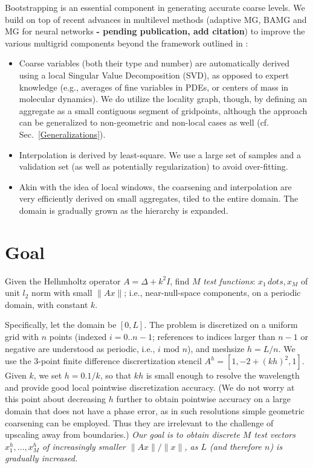 \documentclass{article}
\begin{document}
Bootstrapping is an essential component in generating accurate coarse levels. We build on top of recent advances in multilevel methods (adaptive MG, BAMG \cite{bamg, lamg, mg_guide} and MG for neural networks \textbf{- pending publication, add citation}) to improve the various multigrid components beyond the framework outlined in \cite{su}:
\begin{itemize}
	\item Coarse variables (both their type and number) are automatically derived using a local Singular Value Decomposition (SVD), as opposed to expert knowledge (e.g., averages of fine variables in PDEs, or centers of mass in molecular dynamics). We do utilize the locality graph, though, by defining an aggregate as a small contiguous segment of gridpoints, although the approach can be generalized to non-geometric and non-local cases as well (cf. Sec.~\ref{Generalizations}).
	\item Interpolation is derived by least-square. We use a large set of samples and a validation set (as well as potentially regularization) to avoid over-fitting.
	\item Akin with the idea of local windows, the coarsening and interpolation are very efficiently derived on small aggregates, tiled to the entire domain. The domain is gradually grown as the hierarchy is expanded.
\end{itemize}

\section{Goal}
Given the Helhmholtz operator $A = \Delta + k^2 I$, find $M$ \emph{test functions}: $x_1\,dots,x_M$ of unit $l_2$ norm with small $\|A x\|$; i.e., near-null-space components, on a periodic domain, with constant $k$. 

Specifically, let the domain be $[0,L]$. The problem is discretized on a uniform grid with $n$ points (indexed $i = 0..n-1$; references to indices larger than $n - 1$ or negative are understood as periodic, i.e., $i \text{ mod } n$), and meshsize $h = L/n$. We use the 3-point finite difference discrertization stencil $A^h = [1, -2 + (kh)^2, 1]$. Given $k$, we set $h = 0.1/k$, so that $kh$ is small enough to resolve the wavelength and provide good local pointwise discretization accuracy. (We do not worry at this point about decreasing $h$ further to obtain pointwise accuracy on a large domain that does not have a phase error, as in such resolutions simple geometric coarsening can be employed. Thus they are irrelevant to the challenge of upscaling away from boundaries.) \emph{Our goal is to obtain discrete $M$ test vectors $x^h_1,\dots,x^h_M$ of increasingly smaller $\|A x\|/\|x\|$, as $L$ (and therefore $n$) is gradually increased.}
\end{document}

